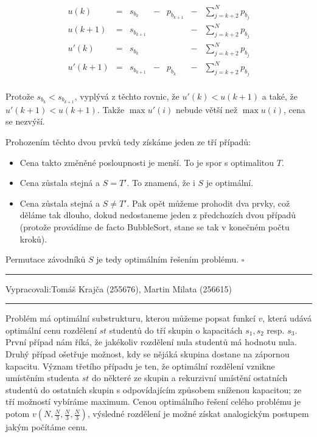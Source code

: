 \documentclass[12pt]{article}
\newcommand{\zadani}[2]{
{\large
\noindent {\bf IB108 \hfill{} Sada #1, Příklad #2 \\[-4mm]}
\noindent\hrule
\vspace{2mm}
\noindent Vypracovali:\hfill{}Tomáš Krajča (255676), Martin Milata (256615)
\vspace{3mm}
\hrule
\bigskip\bigskip}
}
\begin{document}
$$
\begin{array}{rclclcl}
u(k)    & = & s_{b_k}     & - & p_{b_{k+1}} & - & \sum_{j=k+2}^N p_{b_j} \\
u(k+1)  & = & s_{b_{k+1}} &   &             & - & \sum_{j=k+2}^N p_{b_j} \\
u'(k)   & = & s_{b_k}     &   &             & - & \sum_{j=k+2}^N p_{b_j} \\
u'(k+1) & = & s_{b_{k+1}} & - & p_{b_k}     & - & \sum_{j=k+2}^N p_{b_j} \\
\end{array}
$$

\noindent
Protože $s_{b_k} < s_{b_{k+1}}$, vyplývá z těchto rovnic, že $u'(k) < u(k+1)$ a také, že $u'(k+1) <
u(k+1)$. Takže $\max u'(i)$ nebude větší než $\max u(i)$, cena se nezvýší.

\medskip
\noindent
Prohozením těchto dvou prvků tedy získáme jeden ze tří případů:

\begin{itemize}
\item Cena takto změněné posloupnosti je menší. To je spor s optimalitou $T$.
\item Cena zůstala stejná a $S = T'$. To znamená, že i $S$ je optimální.
\item Cena zůstala stejná a $S \neq T'$. Pak opět můžeme prohodit dva prvky, což děláme tak dlouho,
      dokud nedostaneme jeden z předchozích dvou případů (protože provádíme de facto BubbleSort,
      stane se tak v konečném počtu kroků).
\end{itemize}

\noindent
Permutace závodníků $S$ je tedy optimálním řešením problému.
\hfill$\square$

\clearpage
\zadani{2}{3}

\noindent
Problém má optimální substrukturu, kterou můžeme popsat funkcí $v$, která udává optimální cenu
rozdělení $st$ studentů do tří skupin o kapacitách $s_1, s_2$ resp. $s_3$. První případ nám říká, že
jakékoliv rozdělení nula studentů má hodnotu nula. Druhý případ ošetřuje možnost, kdy se nějáká
skupina dostane na zápornou kapacitu. Význam třetího případu je ten, že optimální rozdělení vznikne
umístěním studenta $st$ do některé ze skupin a rekurzivní umístění ostatních studentů do ostatních
skupin s odpovídajícím způsobem sníženou kapacitou; ze tří možností vybíráme maximum. Cenou
optimálního řešení celého problému je potom $v\left(N,\frac{N}{3},\frac{N}{3},\frac{N}{3}\right)$,
výsledné rozdělení je možné získat analogickým postupem jakým počítáme cenu.
\end{document}
